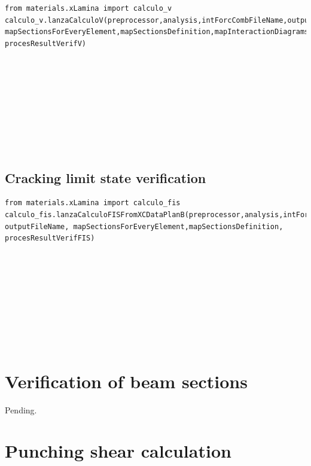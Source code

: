 \begin{verbatim}
from materials.xLamina import calculo_v
calculo_v.lanzaCalculoV(preprocessor,analysis,intForcCombFileName,outputFileName, 
mapSectionsForEveryElement,mapSectionsDefinition,mapInteractionDiagrams,
procesResultVerifV)
\end{verbatim}

\begin{paramFuncTable}
\preprocessor{} \\
\analysis{} \\
\\
\outputFileName{}\\
\mapSectionsForEveryElement{} \\
\mapSectionsDefinition{} \\
\mapInteractionDiagrams{} \\
\procesResultVerifV{} \\
\end{paramFuncTable}


\subsection{Cracking limit state verification}
\begin{verbatim}
from materials.xLamina import calculo_fis
calculo_fis.lanzaCalculoFISFromXCDataPlanB(preprocessor,analysis,intForcCombFileName,
outputFileName, mapSectionsForEveryElement,mapSectionsDefinition,
procesResultVerifFIS)
\end{verbatim}
\begin{paramFuncTable}
\preprocessor{} \\
\analysis{} \\
\\
\outputFileName{}\\
\mapSectionsForEveryElement{} \\
\mapSectionsDefinition{} \\
\mapInteractionDiagrams{} \\
\procesResultVerifFIS{} \\
\end{paramFuncTable}


\section{Verification of beam sections}
Pending.

\section{Punching shear calculation}

